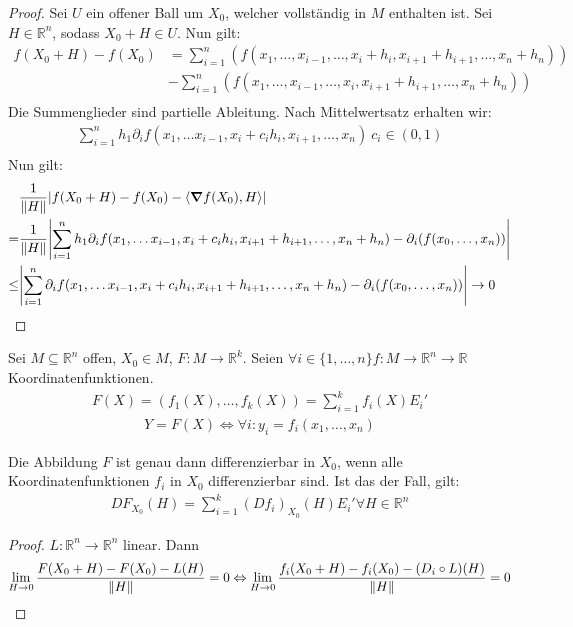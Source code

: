 \documentclass{report}
\newcommand{\bR}{\mathbb{R}}
\newcommand{\scalar}[2]{\left\langle #1, #2 \right\rangle}
\begin{document}
\begin{proof}
 Sei $U$ ein offener Ball um $X_0$, welcher vollständig in $M$ enthalten ist. Sei $H \in \bR^n$, sodass $X_0 + H \in U$. Nun gilt:
 \begin{align*}
  f(X_0 + H) - f(X_0) &= \sum_{i=1}^n (f(x_1, \hdots, x_{i-1}, \hdots, x_i + h_i, x_{i+1} + h_{i+1} , \hdots, x_n + h_n))\\
  &- \sum_{i=1}^n (f(x_1, \hdots, x_{i-1}, \hdots, x_i, x_{i+1} + h_{i+1} , \hdots, x_n + h_n))\\
 \end{align*}
 Die Summenglieder sind partielle Ableitung. Nach Mittelwertsatz erhalten wir:
 \begin{align*}
  \sum_{i=1}^n h_1 \partial_i f(x_1, \hdots x_{i-1}, x_i + c_ih_i, x_{i+1}, \hdots, x_n)\ c_i \in (0,1)\\
 \end{align*}
 Nun gilt:
 \begin{align*}
  &\frac{1}{\norm{H}} \abs{f(X_0 + H) - f(X_0) - \scalar{\grad f(X_0)}{H}}\\
  =&\frac{1}{\norm{H}} \abs{\sum_{i=1}^n h_1 \partial_i f(x_1, \hdots x_{i-1}, x_i + c_ih_i, x_{i+1} + h_{i+1}, \hdots, x_n + h_n) - \partial_i(f(x_0, \hdots, x_n))} \\
  \leq&\abs{\sum_{i=1}^n \partial_i f(x_1, \hdots x_{i-1}, x_i + c_ih_i, x_{i+1} + h_{i+1}, \hdots, x_n + h_n) - \partial_i(f(x_0, \hdots, x_n))} \to 0\\
 \end{align*}
\end{proof}
 Sei $M \subseteq \bR^n$ offen, $X_0 \in M$, $F: M \to \bR^k$. Seien $\forall i \in \{1, \hdots, n\} f: M \to \bR^n \to \bR$ Koordinatenfunktionen.
 \begin{align*}
  F(X) = (f_1(X), \hdots, f_k(X)) = \sum_{i=1}^k f_i(X)E_i'
 \end{align*}
 \begin{align}
  Y = F(X) \Leftrightarrow \forall i : y_i = f_i(x_1, \hdots, x_n)
 \end{align}
\begin{theorem}
Die Abbildung $F$ ist genau dann differenzierbar in $X_0$, wenn alle Koordinatenfunktionen $f_i$ in $X_0$ differenzierbar sind. Ist das der Fall, gilt:
\begin{align*}
 DF_{X_0}(H) = \sum_{i=1}^k (Df_i)_{X_0}(H)E_i' \forall H \in \bR^n 
\end{align*}
\end{theorem}
\begin{proof}
 $L : \bR^n \to \bR^n$ linear. Dann
 \begin{align*}
  \lim_{H \to 0} \frac{F(X_0 + H) - F(X_0) - L(H)}{\norm{H}} = 0 \Leftrightarrow \lim_{H \to 0} \frac{f_i(X_0 + H) - f_i(X_0) - (D_i \circ L)(H)}{\norm{H}} = 0
 \end{align*}
 \end{proof}
\end{document}
